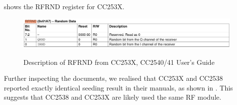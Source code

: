  shows the RFRND register for CC253X.

\begin{figure}[ht!]
\center
\caption{Description of RFRND from CC253X, CC2540/41 User's Guide}
\includegraphics[width=\linewidth]{./figures/CC253X_RFRND.png}
\label{CC253X_RFRND}
\end{figure}

Further inspecting the documents, we realised that CC253X and CC2538 reported exactly identical seeding result in their manuals, as shown in . This suggests that CC2538 and CC253X are likely used the same RF module.

